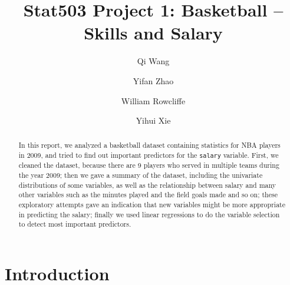 \documentclass[english]{article}
\newenvironment{dummy}{\par}{\par}
\begin{document}
\begin{dummy}

\end{dummy}

\title{Stat503 Project 1: Basketball -- Skills and Salary}


\author{Qi Wang \and Yifan Zhao \and William Rowcliffe \and Yihui Xie}
\maketitle
\begin{abstract}
In this report, we analyzed a basketball dataset containing statistics
for NBA players in 2009, and tried to find out important predictors
for the \texttt{salary} variable. First, we cleaned the dataset, because
there are 9 players who served in multiple teams during the year 2009;
then we gave a summary of the dataset, including the univariate distributions
of some variables, as well as the relationship between salary and
many other variables such as the minutes played and the field goals
made and so on; these exploratory attempts gave an indication that
new variables might be more appropriate in predicting the salary;
finally we used linear regressions to do the variable selection to
detect most important predictors.
\end{abstract}

\section{Introduction}
\end{document}
